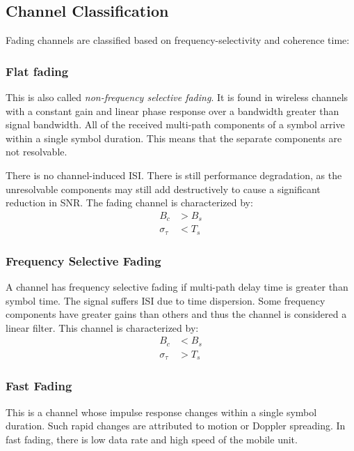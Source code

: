 \subsection{Channel Classification}
Fading channels are classified based on frequency-selectivity and coherence time:
\subsubsection{Flat fading}
This is also called \emph{non-frequency selective fading}. It is found in wireless channels with a constant gain and linear phase response over a bandwidth greater than signal bandwidth\cite{fuqin}. All of the received multi-path components of a symbol arrive within a single symbol duration. This means that the separate components are not resolvable.

There is no channel-induced \gls{ISI}. There is still performance degradation, as the unresolvable components may still add destructively to cause a significant reduction in \gls{SNR}. The fading channel is characterized by:
\begin{align*}
	B_c &> B_s \\
	\sigma_\tau &< T_s
\end{align*}
\begin{mathDef}
\end{mathDef}
\subsubsection{Frequency Selective Fading}
A channel has frequency selective fading if multi-path delay time is greater than symbol time. The signal suffers \gls{ISI} due to time dispersion. Some frequency components have greater gains than others and thus the channel is considered a linear filter\cite{fuqin}. This channel is characterized by:
\begin{align*}
	B_c &< B_s \\
	\sigma_\tau &> T_s
\end{align*}
\subsubsection{Fast Fading}
This is a channel whose impulse response changes within a single symbol duration. Such rapid changes are attributed to motion or Doppler spreading. In fast fading, there is low data rate and high speed of the mobile unit\cite{fuqin}.

